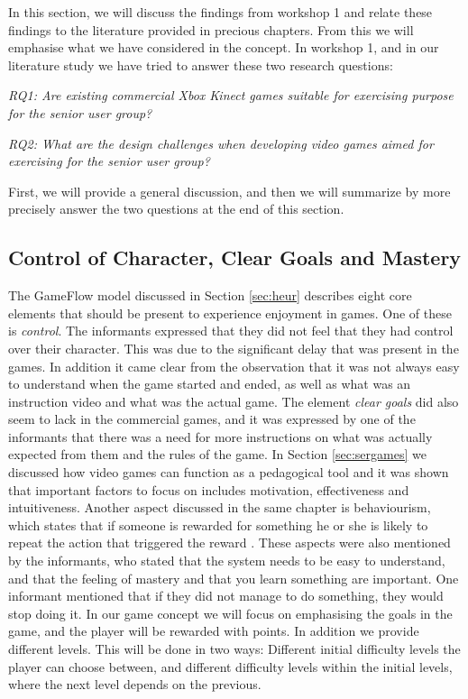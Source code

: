 In this section, we will discuss the findings from workshop 1 and relate these findings to the literature provided in precious chapters. From this we will emphasise what we have considered in the concept. In workshop 1, and in our literature study we have tried to answer these two research questions: 

\emph{RQ1: Are existing commercial Xbox Kinect games suitable for exercising purpose for the senior user group?}

\emph{RQ2: What are the design challenges when developing video games aimed for exercising for the senior user group?}

First, we will provide a general discussion, and then we will summarize by more precisely answer the two questions at the end of this section. 

\subsection{Control of Character, Clear Goals and Mastery}
The GameFlow model \cite{sweetser} discussed in Section \ref{sec:heur} describes eight core elements that should be present to experience enjoyment in games. One of these is \emph{control}. The informants expressed that they did not feel that they had control over their character. This was due to the significant delay that was present in the games. In addition it came clear from the observation that it was not always easy to understand when the game started and ended, as well as what was an instruction video and what was the actual game. The element \emph{clear goals} did also seem to lack in the commercial games, and it was expressed by one of the informants that there was a need for more instructions on what was actually expected from them and the rules of the game. In Section \ref{sec:sergames} we discussed how video games can function as a pedagogical tool and it was shown that important factors to focus on includes motivation, effectiveness and intuitiveness. Another aspect discussed in the same chapter is behaviourism, which states that if someone is rewarded for something he or she is likely to repeat the action that triggered the reward \cite{understandingvg}. These aspects were also mentioned by the informants, who stated that the system needs to be easy to understand, and that the feeling of mastery and that you learn something are important.  One informant mentioned that if they did not manage to do something, they would stop doing it. In our game concept we will focus on emphasising the goals in the game, and the player will be rewarded with points. In addition we provide different levels. This will be done in two ways: Different initial difficulty levels the player can choose between, and different difficulty levels within the initial levels, where the next level depends on the previous.  

